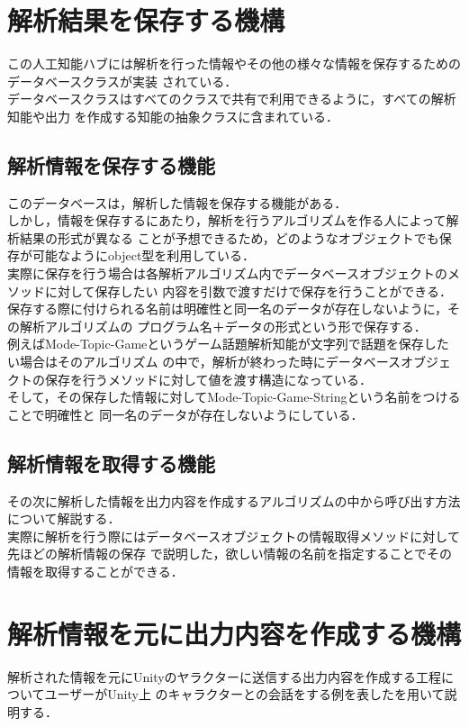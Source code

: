 \section{解析結果を保存する機構}
この人工知能ハブには解析を行った情報やその他の様々な情報を保存するためのデータベースクラスが実装
されている．
\\
データベースクラスはすべてのクラスで共有で利用できるように，すべての解析知能や出力
を作成する知能の抽象クラスに含まれている．
\\
\subsection{解析情報を保存する機能}
このデータベースは，解析した情報を保存する機能がある．
\\
しかし，情報を保存するにあたり，解析を行うアルゴリズムを作る人によって解析結果の形式が異なる
ことが予想できるため，どのようなオブジェクトでも保存が可能なようにobject型を利用している．
\\
実際に保存を行う場合は各解析アルゴリズム内でデータベースオブジェクトのメソッドに対して保存したい
内容を引数で渡すだけで保存を行うことができる．
\\
保存する際に付けられる名前は明確性と同一名のデータが存在しないように，その解析アルゴリズムの
プログラム名＋データの形式という形で保存する．
\\
例えばMode-Topic-Gameというゲーム話題解析知能が文字列で話題を保存したい場合はそのアルゴリズム
の中で，解析が終わった時にデータベースオブジェクトの保存を行うメソッドに対して値を渡す構造になっている．
\\
そして，その保存した情報に対してMode-Topic-Game-Stringという名前をつけることで明確性と
同一名のデータが存在しないようにしている．
\\
\subsection{解析情報を取得する機能}
その次に解析した情報を出力内容を作成するアルゴリズムの中から呼び出す方法について解説する．\\
実際に解析を行う際にはデータベースオブジェクトの情報取得メソッドに対して先ほどの解析情報の保存
で説明した，欲しい情報の名前を指定することでその情報を取得することができる．\\

\newpage

\section{解析情報を元に出力内容を作成する機構}
解析された情報を元にUnityのヤラクターに送信する出力内容を作成する工程についてユーザーがUnity上
のキャラクターとの会話をする例を表したを用いて説明する．

